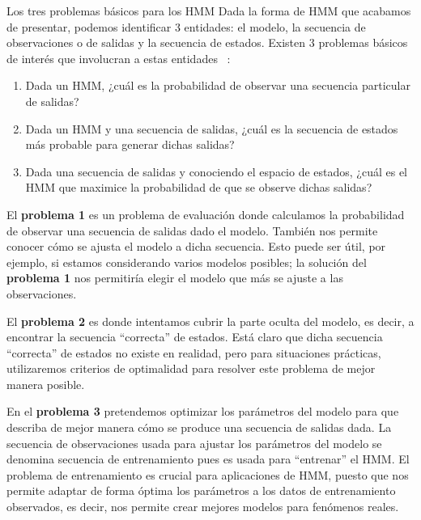 \begin{section}{Los tres problemas básicos para los HMM}
Dada la forma de HMM que acabamos de presentar, podemos identificar 3 entidades: el modelo, la secuencia de observaciones o de salidas y la secuencia de estados. Existen 3 problemas básicos de interés que involucran a estas entidades ~\cite{Vidyasagar}:
\begin{enumerate}
    \item Dada un HMM, ¿cuál es la probabilidad de observar una secuencia particular de salidas?
    \item Dada un HMM y una secuencia de salidas, ¿cuál es la secuencia de estados más probable para generar dichas salidas?
    \item Dada una secuencia de salidas y conociendo el espacio de estados, ¿cuál es el HMM que maximice la probabilidad de que se observe dichas salidas?
\end{enumerate}

El \textbf{problema 1} es un problema de evaluación donde calculamos la probabilidad de observar una secuencia de salidas dado el modelo. También nos permite conocer cómo se ajusta el modelo a dicha secuencia. Esto puede ser útil, por ejemplo, si estamos considerando varios modelos posibles; la solución del \textbf{problema 1} nos permitiría elegir el modelo que más se ajuste a las observaciones.

El \textbf{problema 2} es donde intentamos cubrir la parte oculta del modelo, es decir, a encontrar la secuencia \enquote{correcta} de estados. Está claro que dicha secuencia \enquote{correcta} de estados no existe en realidad, pero para situaciones prácticas, utilizaremos criterios de optimalidad para resolver este problema de mejor manera posible. 

En el \textbf{problema 3} pretendemos optimizar los parámetros del modelo para que describa de mejor manera cómo se produce una secuencia de salidas dada. La secuencia de observaciones usada para ajustar los parámetros del modelo se denomina secuencia de entrenamiento pues es usada para \enquote{entrenar} el HMM. El problema de entrenamiento es crucial para aplicaciones de HMM, puesto que nos permite adaptar de forma óptima los parámetros a los datos de entrenamiento observados, es decir, nos permite crear mejores modelos para fenómenos reales.


\end{section}
